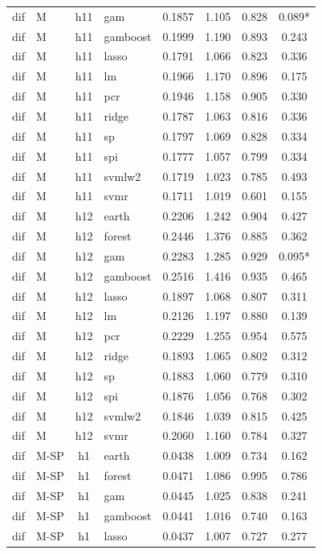 \begin{ThreePartTable}
\begin{longtable}[t]{llclcccc}
dif & M & h11 & gam & 0.1857 & 1.105 & 0.828 & 0.089*\\
dif & M & h11 & gamboost & 0.1999 & 1.190 & 0.893 & 0.243\\
dif & M & h11 & lasso & 0.1791 & 1.066 & 0.823 & 0.336\\
dif & M & h11 & lm & 0.1966 & 1.170 & 0.896 & 0.175\\
dif & M & h11 & pcr & 0.1946 & 1.158 & 0.905 & 0.330\\
dif & M & h11 & ridge & 0.1787 & 1.063 & 0.816 & 0.336\\
dif & M & h11 & sp & 0.1797 & 1.069 & 0.828 & 0.334\\
dif & M & h11 & spi & 0.1777 & 1.057 & 0.799 & 0.334\\
dif & M & h11 & svmlw2 & 0.1719 & 1.023 & 0.785 & 0.493\\
dif & M & h11 & svmr & 0.1711 & 1.019 & 0.601 & 0.155\\
\addlinespace
dif & M & h12 & earth & 0.2206 & 1.242 & 0.904 & 0.427\\
dif & M & h12 & forest & 0.2446 & 1.376 & 0.885 & 0.362\\
dif & M & h12 & gam & 0.2283 & 1.285 & 0.929 & 0.095*\\
dif & M & h12 & gamboost & 0.2516 & 1.416 & 0.935 & 0.465\\
dif & M & h12 & lasso & 0.1897 & 1.068 & 0.807 & 0.311\\
dif & M & h12 & lm & 0.2126 & 1.197 & 0.880 & 0.139\\
dif & M & h12 & pcr & 0.2229 & 1.255 & 0.954 & 0.575\\
dif & M & h12 & ridge & 0.1893 & 1.065 & 0.802 & 0.312\\
dif & M & h12 & sp & 0.1883 & 1.060 & 0.779 & 0.310\\
dif & M & h12 & spi & 0.1876 & 1.056 & 0.768 & 0.302\\
dif & M & h12 & svmlw2 & 0.1846 & 1.039 & 0.815 & 0.425\\
dif & M & h12 & svmr & 0.2060 & 1.160 & 0.784 & 0.327\\
\addlinespace
dif & M-SP & h1 & earth & 0.0438 & 1.009 & 0.734 & 0.162\\
dif & M-SP & h1 & forest & 0.0471 & 1.086 & 0.995 & 0.786\\
dif & M-SP & h1 & gam & 0.0445 & 1.025 & 0.838 & 0.241\\
dif & M-SP & h1 & gamboost & 0.0441 & 1.016 & 0.740 & 0.163\\
dif & M-SP & h1 & lasso & 0.0437 & 1.007 & 0.727 & 0.277\\

\end{longtable}
\end{ThreePartTable}
